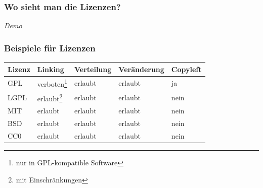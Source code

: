 \documentclass[12pt,compress,ngerman,utf8,t]{beamer}
\begin{document}
\begin{frame}[c]\frametitle{Wo sieht man die Lizenzen?}
  \Huge
  \centering
  \textsl{Demo}
  \par
\end{frame}

\begin{frame}\frametitle{Beispiele für Lizenzen}
  \small\centering
  \begin{tabular}{lllll}
    \toprule
    Lizenz & Linking & Verteilung & Veränderung & Copyleft \\\midrule
    GPL & verboten\footnote{nur in GPL-kompatible Software} & erlaubt & erlaubt & ja \\
    LGPL & erlaubt\footnote{mit Einschränkungen} & erlaubt & erlaubt & nein \\
    MIT & erlaubt & erlaubt & erlaubt & nein \\
    BSD & erlaubt & erlaubt & erlaubt & nein \\
    CC0 & erlaubt & erlaubt & erlaubt & nein \\
    \bottomrule
  \end{tabular}\par
\end{frame}
\end{document}
